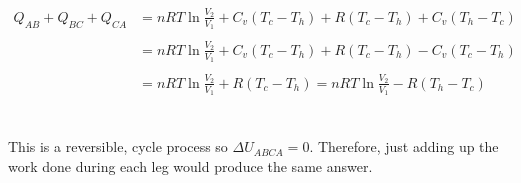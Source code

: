 \documentclass[12pt]{article}
\begin{document}
{\begin{align}
Q_{AB} + Q_{BC} + Q_{CA} &= nRT \ln{\frac{V_{2}}{V_{1}}} + C_{v} (T_{c} - T_{h}) + R (T_{c} - T_{h}) + C_{v} (T_{h} - T_{c})\nonumber\\
\nonumber\\
&= nRT \ln{\frac{V_{2}}{V_{1}}} + C_{v} (T_{c} - T_{h}) + R (T_{c} - T_{h}) - C_{v} (T_{c} - T_{h}) \nonumber\\
\nonumber\\
&=nRT \ln{\frac{V_{2}}{V_{1}}} + R (T_{c} - T_{h}) = \boxed{nRT \ln{\frac{V_{2}}{V_{1}}} - R (T_{h} - T_{c})} \nonumber
\end{align}
\\\\
This is a reversible, cycle process so $\Delta U_{ABCA} = 0$. Therefore, just adding up the work done during each leg would produce the same answer.
}
\end{document}
